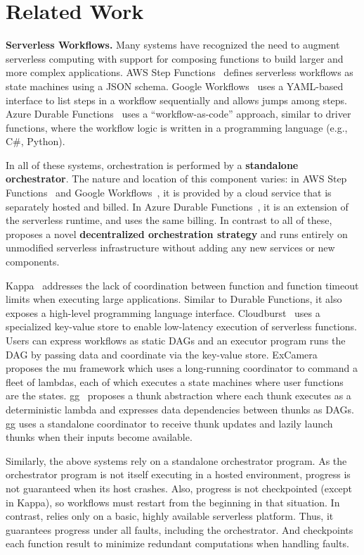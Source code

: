 \section{Related Work}\label{sec:related}

\textbf{Serverless Workflows.} Many systems have recognized the need to
augment serverless computing with support for composing functions to build
larger and more complex applications. AWS Step
Functions~\cite{aws-step-functions} defines serverless workflows as state
machines using a JSON schema. Google Workflows~\cite{google-workflows} uses a
YAML-based interface to list steps in a workflow sequentially and allows jumps
among steps. Azure Durable Functions~\cite{durable-functions} uses a
``workflow-as-code'' approach, similar to driver functions, where the workflow
logic is written in a programming language (e.g., C\#, Python).

In all of these systems, orchestration is performed by a \textbf {standalone
orchestrator}. The nature and location of this component varies: in AWS Step
Functions~\cite{aws-step-functions} and Google Workflows~\cite
{google-workflows}, it is provided by a cloud service that is separately
hosted and billed. In Azure Durable Functions~\cite{durable-functions}, it is
an extension of the serverless runtime, and uses the same billing. In contrast
to all of these, \name{} proposes a novel \textbf{decentralized orchestration
strategy} and runs entirely on unmodified serverless infrastructure without
adding any new services or new components.

Kappa~\cite{kappa} addresses the lack of coordination between function and
function timeout limits when executing large applications. Similar to Durable
Functions, it also exposes a high-level programming language interface.
Cloudburst~\cite{cloudburst} uses a specialized key-value store to enable
low-latency execution of serverless functions. Users can express workflows as
static DAGs and an executor program runs the DAG by passing data and
coordinate via the key-value store. ExCamera~\cite{excamera} proposes the mu
framework which uses a long-running coordinator to command a fleet of lambdas,
each of which executes a state machines where user functions are the states.
gg~\cite{gg-atc} proposes a thunk abstraction where each thunk executes as a
deterministic lambda and expresses data dependencies between thunks as DAGs.
gg uses a standalone coordinator to receive thunk updates and lazily launch
thunks when their inputs become available.

Similarly, the above systems rely on a standalone orchestrator program. As the
orchestrator program is not itself executing in a hosted environment, progress
is not guaranteed when its host crashes. Also, progress is not checkpointed
(except in Kappa), so workflows must restart from the beginning in that
situation. In contrast, \name{} relies only on a basic, highly available
serverless platform. Thus, it guarantees progress under all faults, including
the orchestrator. And \name{} checkpoints each function result to minimize
redundant computations when handling faults.

